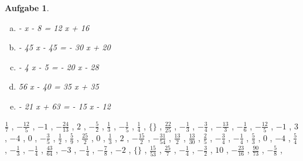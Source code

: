 \documentclass[12pt,fleqn]{article}
\theoremstyle{aufg}
\newtheorem{aufgabe}{Aufgabe}
\theoremstyle{bsp}
\begin{document}
\begin{flushleft}
\begin{aufgabe}
\begin{multicols}{2}
\begin{enumerate}[a)]
- 15 x + 10 = 10 x
\item 
- x - 8 = 12 x + 16
\item 
- 45 x - 45 = - 30 x + 20
\item 
- 4 x - 5 = - 20 x - 28
\item 
56 x - 40 = 35 x + 35
\item 
- 21 x + 63 = - 15 x - 12
\end{enumerate} 
\end{multicols} 
\end{aufgabe} 
$ \scriptstyle\frac{1}{7}$ , $ \scriptstyle- \frac{12}{5}$ , $ \scriptstyle-1$ , $ \scriptstyle- \frac{24}{13}$ , $ \scriptstyle2$ , $ \scriptstyle- \frac{5}{2}$ , $ \scriptstyle\frac{1}{3}$ , $ \scriptstyle- \frac{1}{5}$ , $ \scriptstyle\frac{1}{4}$ , $ \scriptstyle\{\}$ , $ \scriptstyle\frac{22}{25}$ , $ \scriptstyle- \frac{1}{3}$ , $ \scriptstyle- \frac{3}{4}$ , $ \scriptstyle- \frac{13}{3}$ , $ \scriptstyle- \frac{1}{6}$ , $ \scriptstyle- \frac{12}{5}$ , $ \scriptstyle-1$ , $ \scriptstyle3$ , $ \scriptstyle-4$ , $ \scriptstyle0$ , $ \scriptstyle- \frac{3}{5}$ , $ \scriptstyle\frac{1}{2}$ , $ \scriptstyle\frac{5}{9}$ , $ \scriptstyle\frac{25}{2}$ , $ \scriptstyle0$ , $ \scriptstyle\frac{1}{3}$ , $ \scriptstyle2$ , $ \scriptstyle- \frac{15}{2}$ , $ \scriptstyle- \frac{31}{54}$ , $ \scriptstyle\frac{13}{2}$ , $ \scriptstyle\frac{13}{30}$ , $ \scriptstyle\frac{2}{5}$ , $ \scriptstyle- \frac{3}{4}$ , $ \scriptstyle- \frac{1}{4}$ , $ \scriptstyle\frac{5}{3}$ , $ \scriptstyle0$ , $ \scriptstyle-4$ , $ \scriptstyle\frac{5}{4}$ , $ \scriptstyle- \frac{1}{3}$ , $ \scriptstyle- \frac{1}{4}$ , $ \scriptstyle\frac{43}{64}$ , $ \scriptstyle-3$ , $ \scriptstyle- \frac{1}{4}$ , $ \scriptstyle- \frac{7}{8}$ , $ \scriptstyle-2$ , $ \scriptstyle\{\}$ , $ \scriptstyle\frac{15}{53}$ , $ \scriptstyle\frac{25}{7}$ , $ \scriptstyle- \frac{1}{4}$ , $ \scriptstyle- \frac{3}{2}$ , $ \scriptstyle10$ , $ \scriptstyle- \frac{23}{16}$ , $ \scriptstyle\frac{90}{73}$ , $ \scriptstyle- \frac{5}{8}$ , \\[0.2em] 

\end{flushleft}
\end{document}

